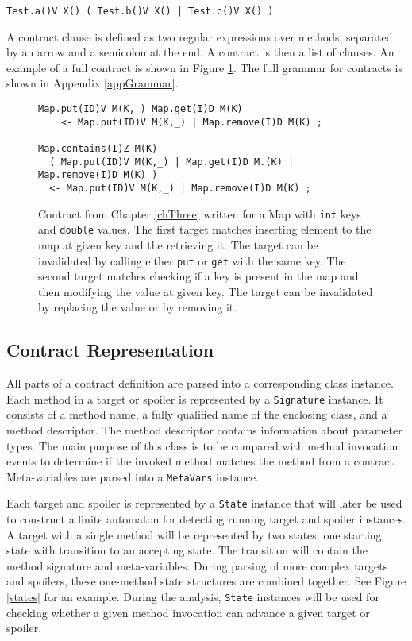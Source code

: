 \begin{lstlisting}
Test.a()V X() ( Test.b()V X() | Test.c()V X() )
\end{lstlisting}

A contract clause is defined as two regular expressions over methods, separated
by an arrow and a semicolon at the end. A contract is then a list of clauses. An
example of a full contract is shown in Figure \ref{contract}. The full grammar
for contracts is shown in Appendix \ref{appGrammar}.

\begin{figure}[hbt]
    \label{contract}
    \begin{lstlisting}
Map.put(ID)V M(K,_) Map.get(I)D M(K)
    <- Map.put(ID)V M(K,_) | Map.remove(I)D M(K) ;

Map.contains(I)Z M(K)
  ( Map.put(ID)V M(K,_) | Map.get(I)D M.(K) | Map.remove(I)D M(K) )
  <- Map.put(ID)V M(K,_) | Map.remove(I)D M(K) ;
\end{lstlisting}
    \caption{Contract from Chapter \ref{chThree} written for a Map with
    \texttt{int} keys and \texttt{double} values. The first target matches
    inserting element to the map at given key and the retrieving it. The target
    can be invalidated by calling either \texttt{put} or \texttt{get} with the
    same key. The second target matches checking if a key is present in the map
    and then modifying the value at given key. The target can be invalidated by
    replacing the value or by removing it.}
\end{figure}

\subsection{Contract Representation}
All parts of a contract definition are parsed into a corresponding class
instance. Each method in a target or spoiler is represented by a
\texttt{Signature} instance. It consists of a method name, a fully qualified
name of the enclosing class, and a method descriptor. The method descriptor
contains information about parameter types. The main purpose of this class is to
be compared with method invocation events to determine if the invoked method
matches the method from a contract. Meta-variables are parsed into a
\texttt{MetaVars} instance.

Each target and spoiler is represented by a \texttt{State} instance that will
later be used to construct a finite automaton for detecting running target and
spoiler instances. A target with a single method will be represented by two
states: one starting state with transition to an accepting state. The transition
will contain the method signature and meta-variables. During parsing of more
complex targets and spoilers, these one-method state structures are combined
together. See Figure \ref{states} for an example. During the analysis,
\texttt{State} instances will be used for checking whether a given method
invocation can advance a given target or spoiler.

